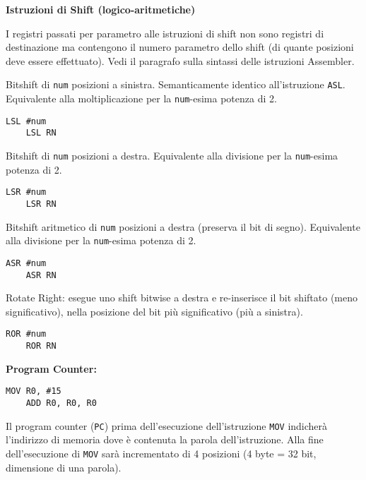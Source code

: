 \begin{defn}
	\textbf{Istruzioni di Shift (logico-aritmetiche)}

	\begin{note}
		I registri passati per parametro alle istruzioni di shift non sono registri di destinazione ma contengono il numero parametro dello shift (di quante posizioni deve essere effettuato). Vedi il paragrafo sulla sintassi delle istruzioni Assembler.
	\end{note}
	
	Bitshift di \verb|num| posizioni a sinistra. Semanticamente identico all'istruzione \verb|ASL|. Equivalente alla moltiplicazione per la \verb|num|-esima potenza di 2.
	\begin{lstlisting}[style=arm]
	LSL #num 
	LSL RN 
	\end{lstlisting}
	
	Bitshift di \verb|num| posizioni a destra. Equivalente alla divisione per la \verb|num|-esima potenza di 2.
	\begin{lstlisting}[style=arm]
	LSR #num
	LSR RN 
	\end{lstlisting}

	
	Bitshift aritmetico di \verb|num| posizioni a destra (preserva il bit di segno). Equivalente alla divisione per la \verb|num|-esima potenza di 2.
	\begin{lstlisting}[style=arm]
	ASR #num 
	ASR RN 
	\end{lstlisting}
	
	

	Rotate Right: esegue uno shift bitwise a destra e re-inserisce il bit shiftato (meno significativo), nella posizione del bit più significativo (più a sinistra).
	\begin{lstlisting}[style=arm]
	ROR #num
	ROR RN
	\end{lstlisting}
	
\end{defn}


\begin{exmp}
	\textbf{Program Counter:}

	
	\begin{lstlisting}[style=arm]
	MOV R0, #15
	ADD R0, R0, R0
	\end{lstlisting}
	
	
	Il program counter (\verb|PC|) prima dell'esecuzione dell'istruzione \verb|MOV| indicherà l'indirizzo di memoria dove è contenuta la parola dell'istruzione. Alla fine dell'esecuzione di \verb|MOV| sarà incrementato di 4 posizioni (4 byte = 32 bit, dimensione di una parola).
\end{exmp}

